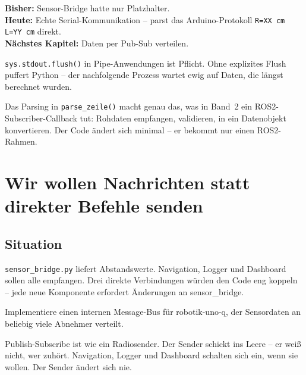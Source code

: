 \begin{projektBox}
\textbf{Bisher:} Sensor-Bridge hatte nur Platzhalter.\\
\textbf{Heute:} Echte Serial-Kommunikation -- parst das
Arduino-Protokoll \texttt{R=XX cm  L=YY cm} direkt.\\
\textbf{Nächstes Kapitel:} Daten per Pub-Sub verteilen.
\end{projektBox}

\begin{merksatzBox}
\texttt{sys.stdout.flush()} in Pipe-Anwendungen ist Pflicht.
Ohne explizites Flush puffert Python -- der nachfolgende
Prozess wartet ewig auf Daten, die längst berechnet wurden.
\end{merksatzBox}

\begin{robotikBox}
Das Parsing in \texttt{parse\_zeile()} macht genau das,
was in Band~2 ein ROS2-Subscriber-Callback tut:
Rohdaten empfangen, validieren, in ein Datenobjekt konvertieren.
Der Code ändert sich minimal -- er bekommt nur einen ROS2-Rahmen.
\end{robotikBox}

\chapter{Wir wollen Nachrichten statt direkter Befehle senden}

\kapitelstruktur

\section{Situation}

\texttt{sensor\_bridge.py} liefert Abstandswerte.
Navigation, Logger und Dashboard sollen alle empfangen.
Drei direkte Verbindungen würden den Code eng koppeln --
jede neue Komponente erfordert Änderungen an sensor\_bridge.

\begin{aufgabeBox}
Implementiere einen internen Message-Bus für robotik-uno-q,
der Sensordaten an beliebig viele Abnehmer verteilt.
\end{aufgabeBox}

\begin{analogie}
Publish-Subscribe ist wie ein Radiosender. Der Sender
schickt ins Leere -- er weiß nicht, wer zuhört.
Navigation, Logger und Dashboard schalten sich ein,
wenn sie wollen. Der Sender ändert sich nie.
\end{analogie}

